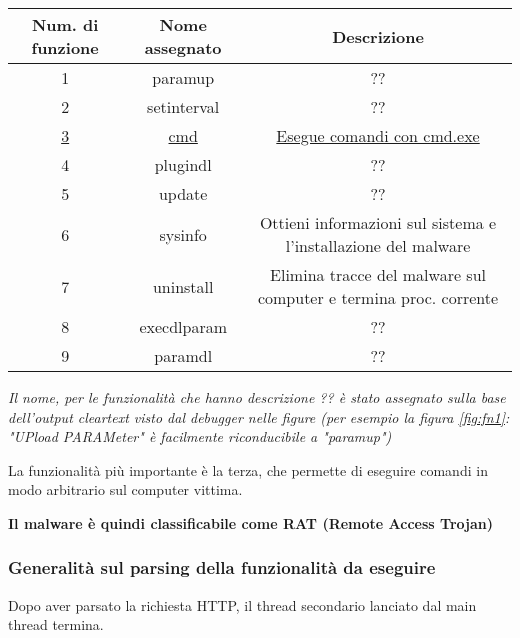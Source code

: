 \documentclass[
    a4paper, %
    11pt %
]{article}
\begin{document}
            \begin{table}[h!]
            \begin{center}
            \begin{tabular}{|c|c|c|}
                \hline
                \textbf{Num. di funzione} & \textbf{Nome assegnato} & \textbf{Descrizione} \\
                \hline\hline
                1 & paramup & ?? \\
                2 & setinterval & ?? \\
                \underline{3} & \underline{cmd} & \underline{Esegue comandi con cmd.exe} \\
                4 & plugindl & ?? \\
                5 & update &  ?? \\
                6 & sysinfo & Ottieni informazioni sul sistema e l'installazione del malware\\
                7 & uninstall & Elimina tracce del malware sul computer e termina proc. corrente\\
                8 & execdlparam & ?? \\
                9 & paramdl & ?? \\
                \hline
            \end{tabular}
            \caption{}
            \label{table:fnlst}
            \end{center}
            \end{table}

            \textit{Il nome, per le funzionalità che hanno descrizione ?? è stato assegnato sulla base dell'output
            cleartext visto dal debugger nelle figure (per esempio la figura \ref{fig:fn1}: "UPload PARAMeter"
            è facilmente riconducibile a "paramup")}

            La funzionalità più importante è la terza, che permette di eseguire comandi in modo arbitrario sul computer
            vittima. 
            
            \textbf{Il malware è quindi classificabile come RAT (Remote Access Trojan)}

            \subsubsection{Generalità sul parsing della funzionalità da eseguire}
            
            Dopo aver parsato la richiesta HTTP, il thread secondario lanciato dal main thread termina.
            
\end{document}
